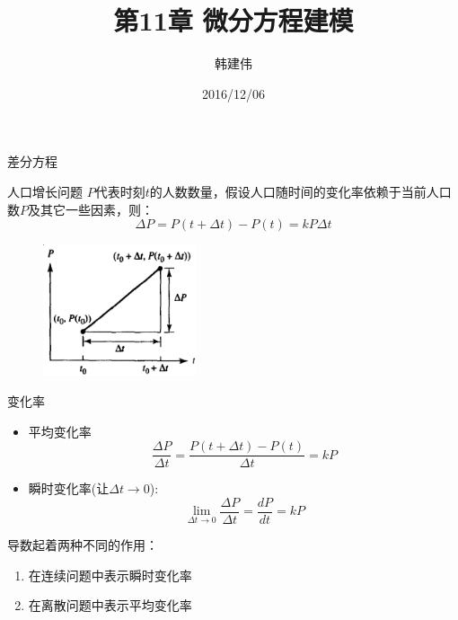 \documentclass[mathserif, table]{beamer}
\title{第11章 微分方程建模}
\author{韩建伟}
\institute{
  信息学院\\
  \texttt{mm@hanjianwei.com}
}
\date{2016/12/06}
\begin{document}
\begin{frame}[plain]
  \titlepage{}
\end{frame}

\begin{frame}{差分方程}
  
  \begin{block}{人口增长问题}
    $P$代表时刻$t$的人数数量，假设人口随时间的变化率依赖于当前人口数$P$及其它一些因素，则：
    \[
    \Delta P = P(t+\Delta t) - P(t) = kP\Delta t
    \]
  \end{block}

  \begin{figure}
    \centering
    \includegraphics[width=0.4\textwidth]{diff.png}
  \end{figure}
  
\end{frame}

\begin{frame}{变化率}
  \begin{itemize}
  \item 平均变化率
    \[
    \frac{\Delta P}{\Delta t} = \frac{P(t+\Delta t) - P(t)}{\Delta t} = kP
    \]
  \item 瞬时变化率(让$\Delta t \rightarrow 0$):
    \[
    \lim_{\Delta t \rightarrow 0} \frac{\Delta P}{\Delta t} =\frac{d P}{d t} =kP
    \]
  \end{itemize}

  导数起着两种不同的作用：

  \begin{enumerate}
  \item 在连续问题中表示瞬时变化率
  \item 在离散问题中表示平均变化率
  \end{enumerate}

\end{frame}
\end{document}

